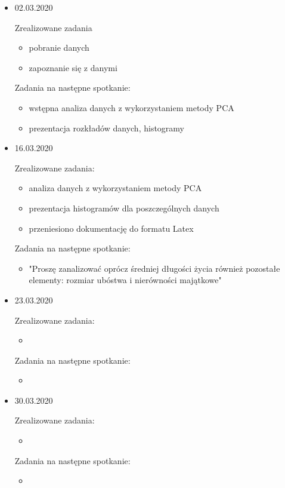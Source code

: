 \documentclass{article}
\begin{document}
\begin{itemize}
  \item 02.03.2020
  
   Zrealizowane zadania
    \begin{itemize}
        \item pobranie danych
        \item zapoznanie się z danymi
    \end{itemize}
    
    Zadania na następne spotkanie:
    \begin{itemize}
        \item wstępna analiza danych z wykorzystaniem metody PCA
        \item prezentacja rozkładów danych, histogramy
    \end{itemize}

  \item 16.03.2020
  
    Zrealizowane zadania:
    \begin{itemize}
        \item analiza danych z wykorzystaniem metody PCA
        \item prezentacja histogramów dla poszczególnych danych
        \item przeniesiono dokumentację do formatu Latex
    \end{itemize}
    
    Zadania na następne spotkanie:
    \begin{itemize}
        \item "Proszę zanalizować oprócz średniej długości życia również pozostałe elementy: rozmiar ubóstwa i
nierówności majątkowe"
    \end{itemize}
  
  \item 23.03.2020
  
    Zrealizowane zadania:
    \begin{itemize}
        \item
    \end{itemize}
    
    Zadania na następne spotkanie:
    \begin{itemize}
        \item
    \end{itemize}
  
  \item 30.03.2020
  
    Zrealizowane zadania:
    \begin{itemize}
        \item
    \end{itemize}
    
    Zadania na następne spotkanie:
    \begin{itemize}
        \item
    \end{itemize}
  
\end{itemize}
\end{document}
